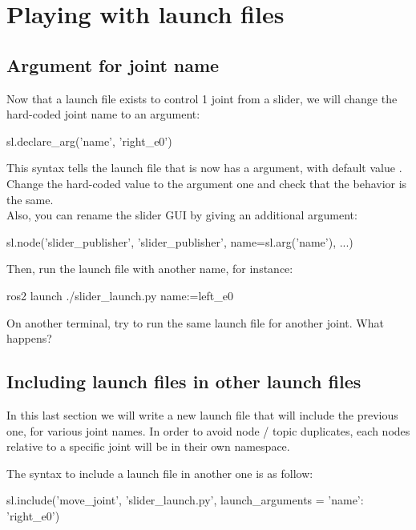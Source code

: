 \documentclass{ecnreport}
\begin{document}
\section{Playing with launch files}

\subsection{Argument for joint name}

Now that a launch file exists to control 1 joint from a slider, we will change the hard-coded joint name to an argument:
\begin{pythoncodelarge}
sl.declare_arg('name', 'right_e0')
\end{pythoncodelarge}
This syntax tells the launch file that is now has a  argument, with default value .\\

Change the hard-coded value to the argument one  and check that the behavior is the same.\\

Also, you can rename the slider GUI by giving an additional argument:
\begin{pythoncodelarge}
sl.node('slider_publisher', 'slider_publisher', name=sl.arg('name'), ...)
\end{pythoncodelarge}

Then, run the launch file with another name, for instance:
\begin{bashcodelarge}
 ros2 launch ./slider_launch.py name:=left_e0
\end{bashcodelarge}
On another terminal, try to run the same launch file for another joint. What happens?\\



\subsection{Including launch files in other launch files}

In this last section we will write a new launch file that will include the previous one, for various joint names. In order to avoid node / topic duplicates, each nodes relative to a specific joint will be in their own namespace. 

The syntax to include a launch file in another one is as follow:
\begin{pythoncodelarge}
sl.include('move_joint', 'slider_launch.py', launch_arguments = {'name': 'right_e0'})
\end{pythoncodelarge}
\end{document}
